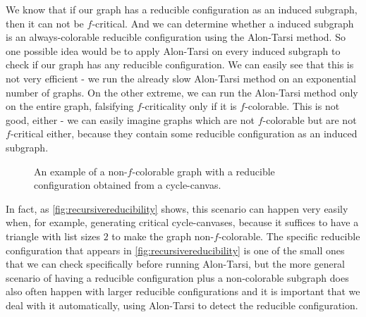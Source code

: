 We know that if our graph has a reducible configuration as an induced subgraph, then it can not
be $f$-critical. And we can determine whether a induced subgraph is an always-colorable reducible 
configuration using the Alon-Tarsi method. So one possible idea would be to apply Alon-Tarsi on 
every induced subgraph to check if our graph has any reducible configuration. We can easily see 
that this is not very efficient - we run the already slow Alon-Tarsi method on an exponential 
number of graphs. On the other extreme, we can run the Alon-Tarsi method only on the entire 
graph, falsifying $f$-criticality only if it is $f$-colorable. This is not good, either - we can 
easily imagine graphs which are not $f$-colorable but are not $f$-critical either, 
because they contain some reducible configuration as an induced subgraph. 


\begin{figure}
\label{fig:recursivereducibility}
\centering
\begin{subfigure}{0.4\textwidth}
\begin{tikzpicture}[scale=0.6]

\end{tikzpicture}
\end{subfigure}
\begin{subfigure}{0.1\textwidth}
\end{subfigure}
\begin{subfigure}{0.4\textwidth}
\begin{tikzpicture}[scale=0.6, yshift=5cm]

\end{tikzpicture}
\end{subfigure}
\caption{An example of a non-$f$-colorable graph with a reducible configuration obtained from a cycle-canvas.}
\end{figure}

In fact, as \ref{fig:recursivereducibility} shows, this scenario can happen very easily when, 
for example, generating critical cycle-canvases, because it suffices to have a triangle with list 
sizes $2$ to make the graph non-$f$-colorable. The specific reducible configuration that appears 
in \ref{fig:recursivereducibility} is one of the small ones that we can check specifically before 
running Alon-Tarsi, but the more general scenario of having a reducible configuration plus a 
non-colorable subgraph does also often happen with larger reducible configurations and it is 
important that we deal with it automatically, using Alon-Tarsi to detect the reducible 
configuration.


